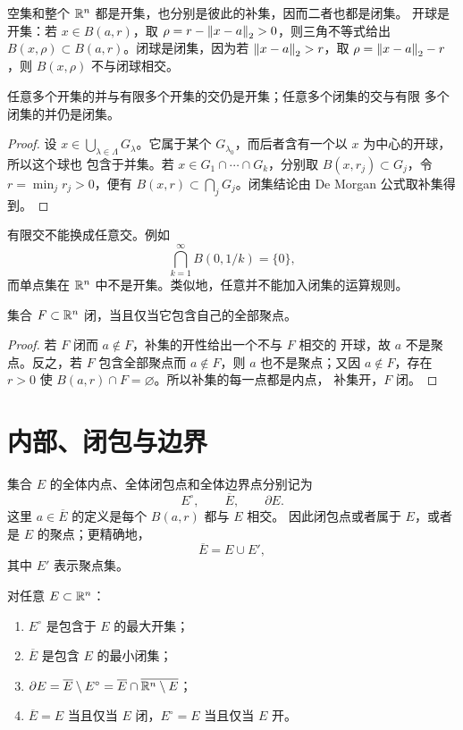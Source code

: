 空集和整个 \(\mathbb{R}^n\) 都是开集，也分别是彼此的补集，因而二者也都是闭集。
开球是开集：若 \(x\in B(a,r)\)，取
\(\rho=r-\left\lVert x-a\right\rVert_2>0\)，则三角不等式给出
\(B(x,\rho)\subset B(a,r)\)。闭球是闭集，因为若
\(\left\lVert x-a\right\rVert_2>r\)，取
\(\rho=\left\lVert x-a\right\rVert_2-r\)，则 \(B(x,\rho)\) 不与闭球相交。

\begin{theorem}[开集与闭集的运算]
\label{thm:euclidean-open-closed-operations}
任意多个开集的并与有限多个开集的交仍是开集；任意多个闭集的交与有限
多个闭集的并仍是闭集。
\end{theorem}

\begin{proof}
设 \(x\in\bigcup_{\lambda\in\Lambda}G_\lambda\)。它属于某个
\(G_{\lambda_0}\)，而后者含有一个以 \(x\) 为中心的开球，所以这个球也
包含于并集。若 \(x\in G_1\cap\cdots\cap G_k\)，分别取
\(B(x,r_j)\subset G_j\)，令 \(r=\min_jr_j>0\)，便有
\(B(x,r)\subset\bigcap_jG_j\)。闭集结论由 De Morgan 公式取补集得到。
\end{proof}

有限交不能换成任意交。例如
\[
 \bigcap_{k=1}^{\infty}B(0,1/k)=\{0\},
\]
而单点集在 \(\mathbb{R}^n\) 中不是开集。类似地，任意并不能加入闭集的运算规则。

\begin{theorem}[闭集的聚点判据]
\label{thm:euclidean-closed-accumulation}
集合 \(F\subset\mathbb{R}^n\) 闭，当且仅当它包含自己的全部聚点。
\end{theorem}

\begin{proof}
若 \(F\) 闭而 \(a\notin F\)，补集的开性给出一个不与 \(F\) 相交的
开球，故 \(a\) 不是聚点。反之，若 \(F\) 包含全部聚点而
\(a\notin F\)，则 \(a\) 也不是聚点；又因 \(a\notin F\)，存在
\(r>0\) 使 \(B(a,r)\cap F=\varnothing\)。所以补集的每一点都是内点，
补集开，\(F\) 闭。
\end{proof}

\section{内部、闭包与边界}

集合 \(E\) 的全体内点、全体闭包点和全体边界点分别记为
\[
 E^\circ,\qquad \overline E,\qquad \partial E.
\]
这里 \(a\in\overline E\) 的定义是每个 \(B(a,r)\) 都与 \(E\) 相交。
因此闭包点或者属于 \(E\)，或者是 \(E\) 的聚点；更精确地，
\[
 \overline E=E\cup E',
\]
其中 \(E'\) 表示聚点集。

\begin{theorem}[内部与闭包的极值性质]
\label{thm:interior-closure-extremal}
对任意 \(E\subset\mathbb{R}^n\)：
\begin{enumerate}[label=\textup{(\roman*)}]
 \item \(E^\circ\) 是包含于 \(E\) 的最大开集；
 \item \(\overline E\) 是包含 \(E\) 的最小闭集；
 \item \(\partial E=\overline E\setminus E^\circ
 =\overline E\cap\overline{\mathbb{R}^n\setminus E}\)；
 \item \(\overline E=E\) 当且仅当 \(E\) 闭，\(E^\circ=E\) 当且仅当
 \(E\) 开。
\end{enumerate}
\end{theorem}


